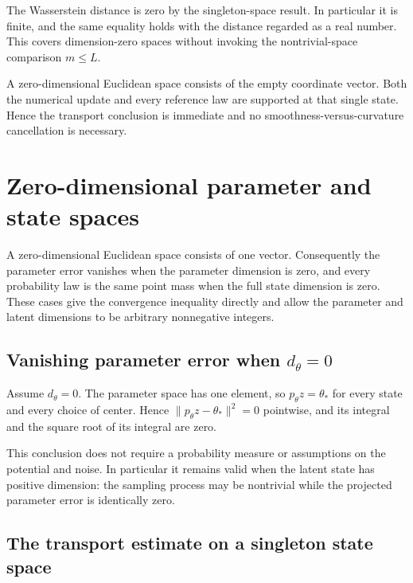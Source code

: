 \documentclass[11pt,a4paper]{article}
\begin{document}
The Wasserstein distance is zero by the singleton-space result. In particular it is finite, and the same equality holds with the distance regarded as a real number. This covers dimension-zero spaces without invoking the nontrivial-space comparison \(m\le L\).



A zero-dimensional Euclidean space consists of the empty coordinate vector. Both the numerical update and every reference law are supported at that single state. Hence the transport conclusion is immediate and no smoothness-versus-curvature cancellation is necessary.


\section{\texorpdfstring{Zero-dimensional parameter and state spaces}{Zero-dimensional parameter and state spaces}}


A zero-dimensional Euclidean space consists of one vector. Consequently the parameter error vanishes when the parameter dimension is zero, and every probability law is the same point mass when the full state dimension is zero. These cases give the convergence inequality directly and allow the parameter and latent dimensions to be arbitrary nonnegative integers.


\subsection{\texorpdfstring{Vanishing parameter error when \(d_\theta=0\)}{Vanishing parameter error when dθ=0}}


Assume \(d_\theta=0\). The parameter space has one element, so \(p_\theta z=\theta_*\) for every state and every choice of center. Hence \(\|p_\theta z-\theta_*\|^2=0\) pointwise, and its integral and the square root of its integral are zero.



This conclusion does not require a probability measure or assumptions on the potential and noise. In particular it remains valid when the latent state has positive dimension: the sampling process may be nontrivial while the projected parameter error is identically zero.



\subsection{\texorpdfstring{The transport estimate on a singleton state space}{The transport estimate on a singleton state space}}
\end{document}
